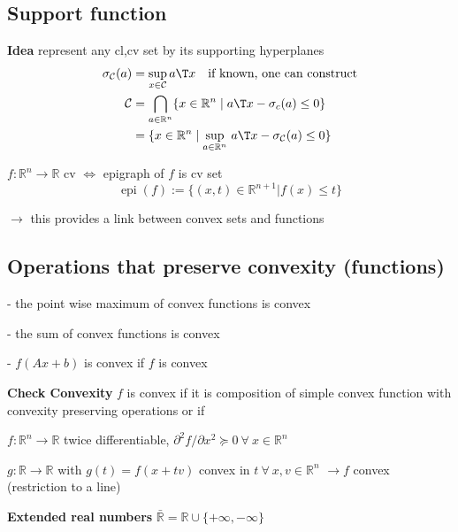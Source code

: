 \subsection{Support function}

\textbf{Idea} represent any cl,cv set by its supporting hyperplanes
\[\begin{aligned}
		\sigma_\mathcal{C}(a) & = \sup_{x \in \mathcal{C}}a\T x
		\quad\text{if known, one can construct}                                                                                                        \\
		\mathcal{C}           & = \bigcap_{a \in \mathbb{R}^n} \{x \in \mathbb{R}^n \mid a\T x - \sigma_c(a) \leq 0\}                                  \\
		                      & = \{x \in \mathbb{R}^n \mid \underset{a \in \mathbb{R}^{n}}{\operatorname{sup}}\ a\T x - \sigma_\mathcal{C}(a) \le 0\}
	\end{aligned}\]
\vspace{-2mm}

\begin{definition}
	$f:\mathbb{R}^n \rightarrow \mathbb{R}$ cv
	$\Leftrightarrow$
	epigraph of $f$ is cv set
	$$\operatorname{epi}(f):=\{(x,t)\in \mathbb{R}^{n+1} | f(x)\le t\}$$
\end{definition}

$\rightarrow$ this provides a link between convex sets and functions

\subsection{Operations that preserve convexity (functions)}

- the point wise maximum of convex functions is convex

- the sum of convex functions is convex

- $f(Ax+b)$ is convex if $f$ is convex

\textbf{Check Convexity} $f$ is convex if it is
composition of simple convex function
with convexity preserving operations
or if

$f: \mathbb{R}^n \rightarrow \mathbb{R}$ twice differentiable,
$\partial^2f/\partial x^2 \succeq 0\ \forall\ x \in \mathbb{R}^{n}$

$g: \mathbb{R} \rightarrow \mathbb{R}$ with $g(t)=f(x+tv)$
convex in $t\ \forall\ x,v \in \mathbb{R}^{n}$
$\rightarrow f$ convex (restriction to a line)

\textbf{Extended real numbers} $\bar{\mathbb{R}} = \mathbb{R} \cup \{+\infty, -\infty\}$

